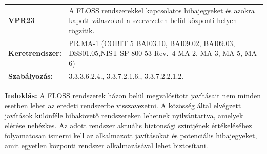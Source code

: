 \documentclass[12pt,magyar,a4paper,oneside]{scrreprt}
\begin{document}
\begin{longtable}[]{@{}ll@{}}
\toprule
\endhead
\begin{minipage}[t]{0.16\columnwidth}\raggedright
\textbf{VPR23}\strut
\end{minipage} & \begin{minipage}[t]{0.79\columnwidth}\raggedright
A FLOSS rendszerekkel kapcsolatos hibajegyeket és azokra kapott
válaszokat a szervezeten belül központi helyen rögzítik.\strut
\end{minipage}\tabularnewline
\begin{minipage}[t]{0.16\columnwidth}\raggedright
\textbf{Keretrendszer:}\strut
\end{minipage} & \begin{minipage}[t]{0.79\columnwidth}\raggedright
PR.MA-1 (COBIT 5 BAI03.10, BAI09.02, BAI09.03, DSS01.05,NIST SP 800-53
Rev.~4 MA-2, MA-3, MA-5, MA-6)\strut
\end{minipage}\tabularnewline
\begin{minipage}[t]{0.16\columnwidth}\raggedright
\textbf{Szabályozás:}\strut
\end{minipage} & \begin{minipage}[t]{0.79\columnwidth}\raggedright
3.3.3.6.2.4., 3.3.7.2.1.6., 3.3.7.2.2.1.2.\strut
\end{minipage}\tabularnewline
\bottomrule
\end{longtable}

\textbf{Indoklás: } A FLOSS rendszerek házon belül megvalósított
javításait nem minden esetben lehet az eredeti rendszerbe visszavezetni.
A közösség által elvégzett javítások különféle hibakövető rendszereken
lehetnek nyilvántartva, amelyek elérése nehézkes. Az adott rendszer
aktuális biztonsági szintjének értékeléséhez folyamatosan ismerni kell
az alkalmazott javításokat és potenciális hibajegyeket, amit egyetlen
központi rendszer alkalmazásával lehet biztosítani.
\end{document}
